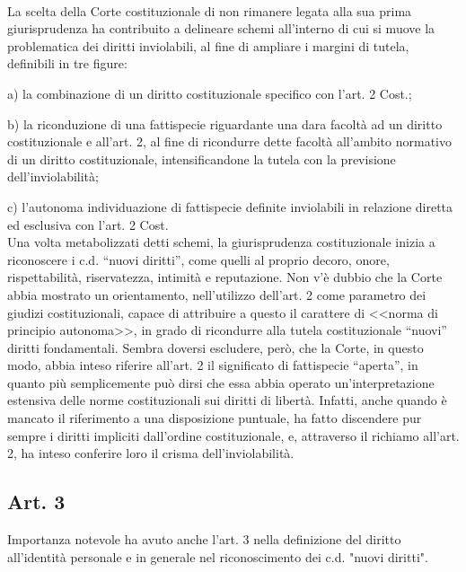 \\La scelta della Corte costituzionale di non rimanere legata alla sua prima giurisprudenza ha contribuito a delineare schemi all'interno di cui si muove la problematica dei diritti inviolabili, al fine di ampliare i margini di tutela, definibili in tre figure: 

a) la combinazione di un diritto costituzionale specifico con l’art. 2 Cost.;

b) la riconduzione di una fattispecie riguardante una dara facoltà ad un diritto costituzionale e all’art. 2, al fine di ricondurre dette facoltà all’ambito normativo di un diritto costituzionale, intensificandone la tutela con la previsione dell’inviolabilità; 

c) l’autonoma individuazione di fattispecie definite inviolabili in relazione diretta ed esclusiva con l’art. 2 Cost.
\\Una volta metabolizzati detti schemi, la giurisprudenza costituzionale inizia a riconoscere i c.d. “nuovi diritti”, come quelli al proprio decoro, onore, rispettabilità, riservatezza, intimità e reputazione.
Non v’è dubbio che la Corte abbia mostrato un orientamento, nell’utilizzo dell’art. 2 come parametro dei giudizi costituzionali, capace di attribuire a questo il carattere di <<norma di principio autonoma>>, in grado di ricondurre alla tutela costituzionale “nuovi” diritti fondamentali. Sembra doversi escludere, però, che la Corte, in questo modo, abbia inteso riferire all’art. 2 il significato di fattispecie “aperta”, in quanto più semplicemente può dirsi che essa abbia operato un’interpretazione estensiva delle norme costituzionali sui diritti di libertà. Infatti, anche quando è mancato il riferimento a una disposizione puntuale, ha fatto discendere pur sempre i diritti impliciti dall’ordine costituzionale, e, attraverso il richiamo all’art. 2, ha inteso conferire loro il crisma dell’inviolabilità.


\subsection{Art. 3}
Importanza notevole ha avuto anche l'art. 3 nella definizione del diritto all'identità personale e in generale nel riconoscimento dei c.d. "nuovi diritti".

